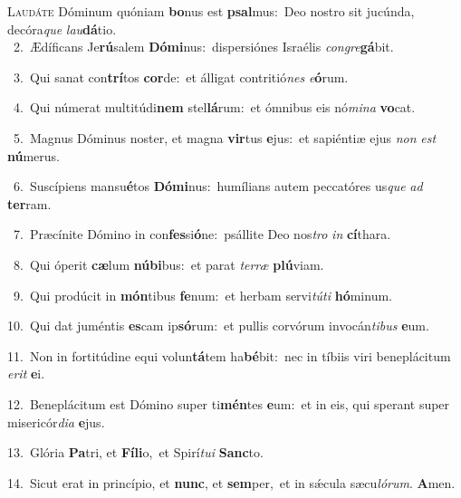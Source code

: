 \lettrine{\initial\textcolor{\initialcolor}{L}}{audáte} Dóminum quóniam \textbf{bo}\-nus est \textbf{psal}\-mus:~\star Deo nostro sit jucúnda, decóra\textit{que} \textit{lau}\-\textbf{dá}tio.\\
{\numbfont\textcolor{\numbcolor}{~2.}}~Ædíficans Je\-\textbf{rú}\-salem \textbf{Dó}\-\textbf{mi}nus:~\star dispersiónes Israélis \textit{con}\-\textit{gre}\textbf{gá}bit.\par
{\numbfont\textcolor{\numbcolor}{~3.}}~Qui sanat con\-\textbf{trí}\-tos \textbf{cor}\-de:~\star et álligat contritió\textit{nes} \textit{e}\-\textbf{ó}rum.\par
{\numbfont\textcolor{\numbcolor}{~4.}}~Qui númerat multitúdi\textbf{nem} stel\-\textbf{lá}\-rum:~\star et ómnibus eis nó\-\textit{mi}\-\textit{na} \textbf{vo}\-cat.\par
{\numbfont\textcolor{\numbcolor}{~5.}}~Magnus Dóminus noster, et magna \textbf{vir}\-tus \textbf{e}\-jus:~\star et sapiéntiæ ejus \textit{non} \textit{est} \textbf{nú}\-merus.\par
{\numbfont\textcolor{\numbcolor}{~6.}}~Suscípiens mansu\-\textbf{é}\-tos \textbf{Dó}\-\textbf{mi}nus:~\star humílians autem peccatóres us\textit{que} \textit{ad} \textbf{ter}\-ram.\par
{\numbfont\textcolor{\numbcolor}{~7.}}~Præcínite Dómino in con\-\textbf{fes}\-si\-\textbf{ó}\-ne:~\star psállite Deo nos\textit{tro} \textit{in} \textbf{cí}\-thara.\par
{\numbfont\textcolor{\numbcolor}{~8.}}~Qui óperit \textbf{cæ}\-lum \textbf{nú}\-\textbf{bi}bus:~\star et parat \textit{ter}\-\textit{ræ} \textbf{plú}\-viam.\par
{\numbfont\textcolor{\numbcolor}{~9.}}~Qui prodúcit in \textbf{món}\-tibus \textbf{fe}\-num:~\star et herbam servi\-\textit{tú}\-\textit{ti} \textbf{hó}\-minum.\par
{\numbfont\textcolor{\numbcolor}{10.}}~Qui dat juméntis \textbf{es}\-cam ip\-\textbf{só}\-rum:~\star et pullis corvórum invocán\-\textit{ti}\-\textit{bus} \textbf{e}\-um.\par
{\numbfont\textcolor{\numbcolor}{11.}}~Non in fortitúdine equi volun\-\textbf{tá}\-tem ha\-\textbf{bé}\-bit:~\star nec in tíbiis viri beneplácitum \textit{e}\-\textit{rit} \textbf{e}\-i.\par
{\numbfont\textcolor{\numbcolor}{12.}}~Beneplácitum est Dómino super ti\-\textbf{mén}\-tes \textbf{e}\-um:~\star et in eis, qui sperant super misericór\-\textit{di}\-\textit{a} \textbf{e}\-jus.\par
{\numbfont\textcolor{\numbcolor}{13.}}~Glória \textbf{Pa}\-tri, et \textbf{Fí}\-\textbf{li}o,~\star et Spirí\-\textit{tu}\-\textit{i} \textbf{Sanc}\-to.\par
{\numbfont\textcolor{\numbcolor}{14.}}~Sicut erat in princípio, et \textbf{nunc}\-, et \textbf{sem}\-per,~\star et in sǽcula sæcu\-\textit{ló}\-\textit{rum}. \textbf{A}\-men.\par
